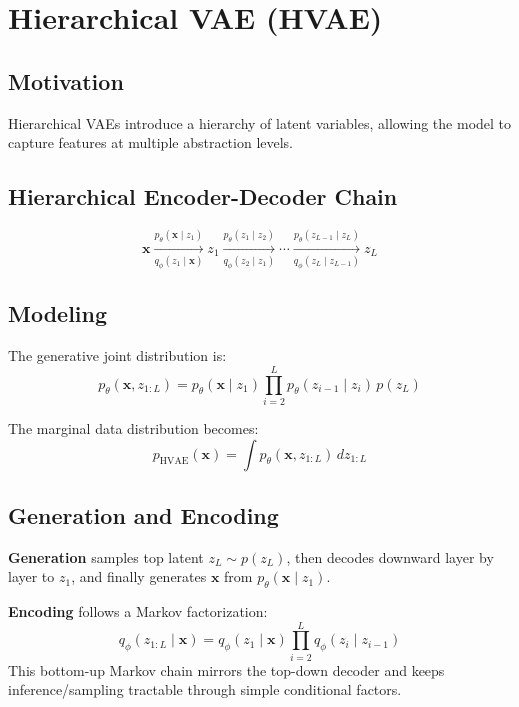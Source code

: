 \documentclass[11pt,a4paper]{article}
\newcommand{\bx}{\mathbf{x}} \newcommand{\by}{\mathbf{y}}
\begin{document}
\section{Hierarchical VAE (HVAE)}\label{sec:hvae}

\subsection{Motivation}

Hierarchical VAEs introduce a hierarchy of latent variables, allowing the model to capture features at multiple abstraction levels.

\subsection{Hierarchical Encoder-Decoder Chain}

\[
\bx \xrightarrow[q_\phi(z_1\mid \bx)]{p_\theta(\bx\mid z_1)} z_1
\xrightarrow[q_\phi(z_2\mid z_1)]{p_\theta(z_1\mid z_2)}
\cdots
\xrightarrow[q_\phi(z_L\mid z_{L-1})]{p_\theta(z_{L-1}\mid z_L)} z_L
\]

\subsection{Modeling}

The generative joint distribution is:
\[
    p_\theta(\bx,z_{1:L})
    = p_\theta(\bx\mid z_1)\prod_{i=2}^{L} p_\theta(z_{i-1}\mid z_i)\,p(z_L)
\]

The marginal data distribution becomes:
\[
    p_{\mathrm{HVAE}}(\bx)=\int p_\theta(\bx,z_{1:L})\,dz_{1:L}
\]

\subsection{Generation and Encoding}

\textbf{Generation} samples top latent $z_L\sim p(z_L)$, then decodes downward layer by layer to $z_1$, and finally generates $\bx$ from $p_\theta(\bx\mid z_1)$.

\medskip
\textbf{Encoding} follows a Markov factorization:
\[
    q_\phi(z_{1:L}\mid \bx)=q_\phi(z_1\mid \bx)\prod_{i=2}^{L} q_\phi(z_i\mid z_{i-1})
\]
This bottom-up Markov chain mirrors the top-down decoder and keeps inference/sampling tractable through simple conditional factors.

\end{document}
